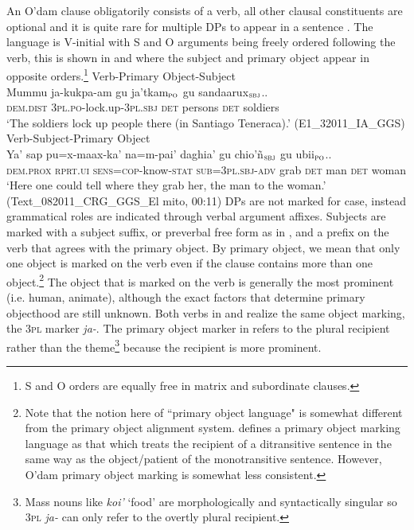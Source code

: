 \documentclass[output=paper,draft,draftmode,colorlinks,citecolor=brown]{langscibook}
\begin{document}
An O’dam clause obligatorily consists of a verb, all other clausal constituents are optional and it is quite rare for multiple DPs to appear in a sentence \citep{willett1991, garcia2014}. The language is V-initial with S and O arguments being freely ordered following the verb, this is shown in  and  where the subject and primary object appear in opposite orders.\footnote{S and O orders are equally free in matrix and subordinate clauses.}
\ea
\label{ex:odam-vpos}
Verb-Primary Object-Subject\\
\gll Mummu ja-kukpa-am {\ob}gu ja’tkam{\cb}$_{\textsc{po}}$ {\ob}gu sandaarux{\cb}$_{\textsc{sbj}}$..\\
\textsc{dem.dist} \textsc{3pl.po}-lock.up-3\textsc{pl.sbj} \textsc{det} persons \textsc{det} 	soldiers\\
\glt `The soldiers lock up people there (in Santiago Teneraca).' (E1\_32011\_IA\_GGS)
\z
\ea
\label{ex:odam-vspo}
Verb-Subject-Primary Object\\
\gll Ya' sap pu=x-maax-ka’ na=m-pai’ daghia’ {\ob}gu chio’ñ{\cb}$_{\textsc{sbj}}$ {\ob}gu ubii{\cb}$_{\textsc{po}}$..\\
\textsc{dem.prox} \textsc{rprt.ui} \textsc{sens=cop}-know-\textsc{stat} \textsc{sub=3pl.sbj-adv} grab \textsc{det} man \textsc{det} woman\\
\glt ‘Here one could tell where they grab her, the man to the woman.’ (Text\_082011\_CRG\_GGS\_El mito, 00:11)
\z
DPs are not marked for case, instead grammatical roles are indicated through verbal argument affixes. Subjects are marked with a subject suffix, or preverbal free form as in , and a prefix on the verb that agrees with the primary object. By primary object, we mean that only one object is marked on the verb even if the clause contains more than one object.\footnote{Note that the notion here of ``primary object language" is somewhat different from the primary object alignment system. \citet{dryer1986} defines a primary object marking language as that which treats the recipient of a ditransitive sentence in the same way as the object/patient of the monotransitive sentence. However, O'dam primary object marking is somewhat less consistent.} The object that is marked on the verb is generally the most prominent (i.e. human, animate), although the exact factors that determine primary objecthood are still unknown. Both verbs in  and  realize the same object marking, the \textsc{3pl} marker \emph{ja-}. The primary object marker in  refers to the plural recipient rather than the theme\footnote{Mass nouns like \emph{koi'} `food' are morphologically and syntactically singular so \textsc{3pl} \emph{ja-} can only refer to the overtly plural recipient.} because the recipient is more prominent.
\end{document}
